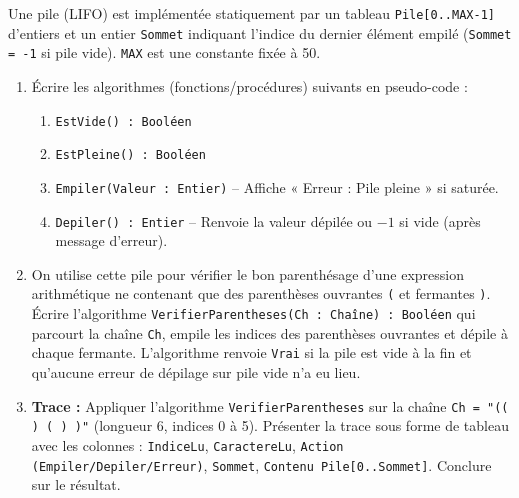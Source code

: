 \documentclass[11pt]{article}
\begin{document}
\begin{exercice}
Une pile (LIFO) est implémentée statiquement par un tableau \texttt{Pile[0..MAX-1]} d'entiers et un entier \texttt{Sommet} indiquant l'indice du dernier élément empilé (\texttt{Sommet = -1} si pile vide). \texttt{MAX} est une constante fixée à 50.

\begin{enumerate}
    \item Écrire les algorithmes (fonctions/procédures) suivants en pseudo-code :
    \begin{enumerate}
        \item \texttt{EstVide() : Booléen}
        \item \texttt{EstPleine() : Booléen}
        \item \texttt{Empiler(Valeur : Entier)} -- Affiche « Erreur : Pile pleine » si saturée.
        \item \texttt{Depiler() : Entier} -- Renvoie la valeur dépilée ou $-1$ si vide (après message d'erreur).
    \end{enumerate}
    \item On utilise cette pile pour vérifier le bon parenthésage d'une expression arithmétique ne contenant que des parenthèses ouvrantes \texttt{(} et fermantes \texttt{)}. 
    Écrire l'algorithme \texttt{VerifierParentheses(Ch : Chaîne) : Booléen} qui parcourt la chaîne \texttt{Ch}, empile les indices des parenthèses ouvrantes et dépile à chaque fermante. L'algorithme renvoie \texttt{Vrai} si la pile est vide à la fin et qu'aucune erreur de dépilage sur pile vide n'a eu lieu.
    \item \textbf{Trace :} Appliquer l'algorithme \texttt{VerifierParentheses} sur la chaîne \texttt{Ch = "(( ) ( ) )"} (longueur 6, indices 0 à 5). 
    Présenter la trace sous forme de tableau avec les colonnes : \texttt{IndiceLu}, \texttt{CaractereLu}, \texttt{Action (Empiler/Depiler/Erreur)}, \texttt{Sommet}, \texttt{Contenu Pile[0..Sommet]}. Conclure sur le résultat.
\end{enumerate}
\end{exercice}
\end{document}
